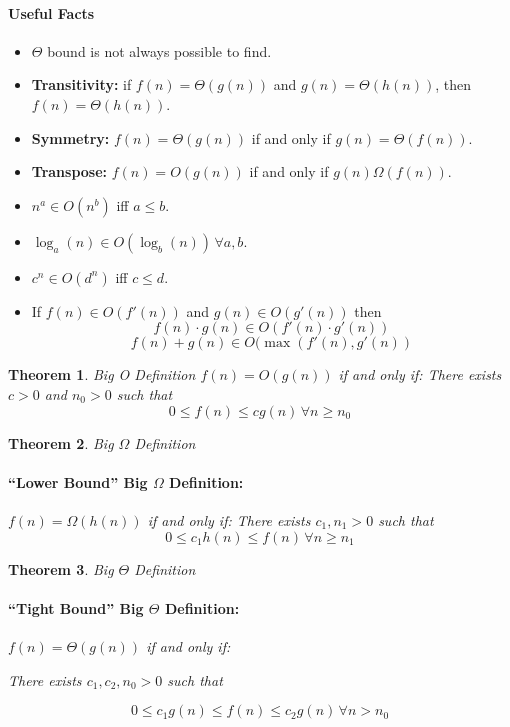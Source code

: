 \documentclass[a4paper,12pt]{report}
\newtheorem{theorem}{Theorem}
\begin{document}
\paragraph{Useful Facts} 
\begin{itemize}
\item $\Theta$ bound is not always possible to find. 
\item \textbf{Transitivity: } if $f(n) = \Theta(g(n))$ and $g(n) = \Theta(h(n))$, then $f(n) = \Theta(h(n))$.
\item \textbf{Symmetry: } $f(n) = \Theta(g(n))$ if and only if $g(n) = \Theta(f(n))$.
\item \textbf{Transpose: } $f(n) = O(g(n))$ if and only if $g(n) \Omega(f(n))$.
\item $n^a \in O(n^b)$ iff $a \leq b$.
\item $\log_a(n) \in O(\log_b(n)) \, \forall a, b$.
\item $c^n \in O(d^n)$ iff $c\leq d$.
\item If $f(n) \in O(f'(n))$ and $g(n) \in O(g'(n))$ then $$f(n)\cdot g(n) \in O(f'(n)\cdot g'(n))$$
$$f(n) + g(n) \in O(\max(f'(n), g'(n))$$
\end{itemize}




\begin{theorem}{Big O Definition}
$f(n) = O(g(n))$ if and only if: 
There exists $c > 0$ and $n_0 > 0$ such that
\begin{equation}
0 \leq f(n) \leq cg(n)\,\forall n \geq n_0 
\end{equation}
\end{theorem}


\begin{theorem}{Big $\Omega$ Definition}
\paragraph{``Lower Bound'' Big $\Omega$ Definition: } $f(n) = \Omega(h(n))$ if and only if:
There exists $c_1, n_1 > 0$ such that 
\begin{equation}
0 \leq c_1 h(n) \leq f(n)\, \forall n \geq n_1
\end{equation}
\end{theorem}



\begin{theorem}{Big $\Theta$ Definition}
\paragraph{``Tight Bound'' Big $\Theta$ Definition: } $f(n) = \Theta(g(n))$ if and only if:

There exists $c_1, c_2, n_0 > 0$ such that 

\begin{equation}
0 \leq c_1 g(n) \leq f(n) \leq c_2 g(n) \, \forall n > n_0
\end{equation}
\end{theorem}
\end{document}
